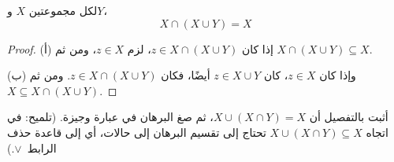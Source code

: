 \documentclass[../../../include/open-logic-section]{subfiles}
\begin{document}
\begin{prop}[الامتصاص]
لكل مجموعتين $X$ و$Y$،
\[
X \cap (X \cup Y) = X
\]
\end{prop}

\begin{proof}
(أ) إذا كان $z \in X \cap (X \cup Y)$، لزم $z \in X$، ومن ثم
  $X \cap (X \cup Y) \subseteq X$.

(ب) وإذا كان $z \in X$، كان $z \in X \cup Y$ أيضًا، فكان
  $z \in X \cap (X \cup Y)$. ومن ثم
  $X \subseteq X \cap (X \cup Y)$.
\end{proof}

\begin{prob}
أثبت بالتفصيل أن $X \cup (X \cap Y) = X$، ثم صغ البرهان في عبارة
وجيزة. (تلميح: في اتجاه $X \cup (X \cap Y) \subseteq X$ تحتاج
إلى تقسيم البرهان إلى حالات، أي إلى قاعدة حذف الرابط~$\lor$.)
\end{prob}
\end{document}
